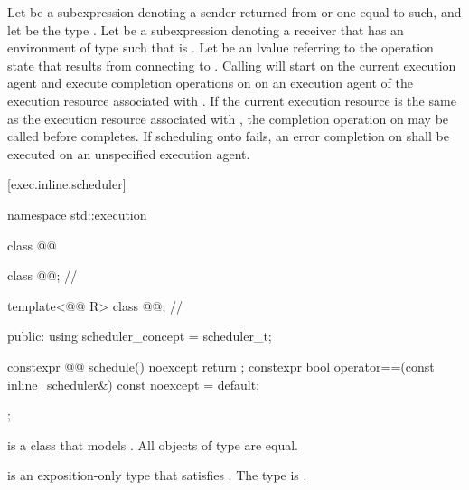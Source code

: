 \pnum
Let  be a subexpression denoting a sender
returned from  or one equal to such,
and let  be the type .
Let  be a subexpression denoting a receiver that
has an environment of type  such that 
is .
Let  be an lvalue referring to the operation state that
results from connecting  to .
Calling  will start  on the current
execution agent and execute completion operations on 
on an execution agent of the execution resource associated with
.
If the current execution resource is the same as the execution
resource associated with , the completion operation on
 may be called before  completes.
If scheduling onto  fails, an error completion on
 shall be executed on an unspecified execution
agent.

[exec.inline.scheduler]{}

\begin{codeblock}
namespace std::execution {
  class @@ {
    class @@;                // \expos

    template<@@ R>
      class @@;               // \expos

  public:
    using scheduler_concept = scheduler_t;

    constexpr @@ schedule() noexcept { return {}; }
    constexpr bool operator==(const inline_scheduler&) const noexcept = default;
  };
}
\end{codeblock}

\pnum
{} is a class that models
.
All objects of type  are equal.

\pnum
{} is an exposition-only type that satisfies
.
The type 
is .

